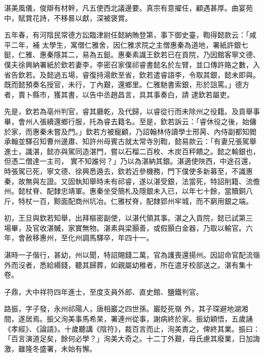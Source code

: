\begin{pinyinscope}
 湛美風儀，俊辯有材幹，凡五使西北議邊要。真宗有意擢任，顧遇甚厚。曲宴苑中，賦賞花詩，不移晷以獻，深被褒賞。



 五年春，有河陰民常德方訟臨津尉任懿納賄登第，事下御史臺，鞫得懿款云：「咸平二年，補
 太學生，寓僧仁雅舍，因仁雅求院之主僧惠秦為道地，署紙許銀七鋌，仁雅、惠秦隱其二，易為五鋌。惠秦素識王欽若已在貢院，乃因館客寧文德、僕夫徐興納署紙於欽若妻李，李密召家僕祁睿書懿名於左臂，並口傳許賂之數，入省告欽若。及懿過五場，睿復持湯飲至省，欽若遣睿語李，令取其銀，懿未即與。既而懿預奏名授官，未行，丁內艱，還鄉里。仁雅馳書索銀，形於詛罵。」德方者，賣卜縣市，獲其書，以告中丞趙昌言，具其事奏白，請
 逮欽若屬吏。



 先是，欽若為亳州判官，睿其廳乾，及代歸，以睿從行而未除州之役籍。及貢舉事畢，會州人張續還鄉行服，托為睿去籍名。至是，欽若訴云：「睿休役之後，始傭於家，而惠秦未嘗及門。」欽若方被寵顧，乃詔翰林侍讀學士邢昺、內侍副都知閻承翰並驛召知曹州邊肅、知許州毋賓古就太常寺別鞫，懿易款云：「有妻兄張駕舉進士，識湛，懿亦與駕同造湛門，嘗以石榴二百枚、木炭百秤饋之。懿之輸銀也，但憑二僧達一主司，
 實不知誰何？」乃以為湛納其銀。湛適使陜西，中途召還，時張駕已死，寧文德、徐興悉遁去，欽若近參機務，門下僕使多新募至，不識惠秦，故無與左證。又固執知舉時未有祁睿，遂以湛受銀，法當死，特詔削籍、流儋州。懿杖脊、配隸忠靖軍。惠秦坐受簡札及隱銀未入已，以年七十餘，當贖銅八斤，特杖一百，黥面配商州坑冶。仁雅杖脊，配隸郢州牢城，而不窮用銀之端。



 初，王旦與欽若知舉，出拜樞密副使，以湛代領其事。湛之入貢院，懿已試第三
 場畢，及官收湛贓，家實無物。湛素與梁顥善，或假顥白金器，乃取以輸官。六年，會赦移惠州，至化州調馬驛卒，年四十一。



 湛時一子偕行，甚幼，州以聞，特詔賜錢二萬，官為護喪還揚州。因詔命官配流嶺外而沒者，悉給緡錢，聽其歸葬，如親屬幼稚者，所在遣牙校部送之。湛有集十卷。



 子鼎，大中祥符四年進士，至度支員外郎、直史館、鹽鐵判官。



 路振，字子發，永州祁陽人，唐相巖之四世孫。巖貶死嶺
 外，其子琛避地湖湘間，遂居焉。振父洵美事馬希杲，署連州從事，謝病終於家。振幼穎悟，五歲誦《孝經》、《論語》。十歲聽講《陰符》，裁百言而止，洵美責之，俾終其業。振曰：「百言演道足矣，餘何必學？」洵美大奇之。十二丁外艱，母氏慮其廢業，日加誨激，雖隆冬盛署，未始有懈。




\end{pinyinscope}
